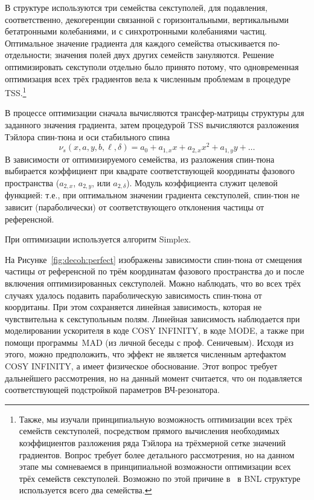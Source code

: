 В структуре используются три семейства секступолей, для подавления, соответственно, декогеренции связанной 
с горизонтальными, вертикальными бетатронными колебаниями, и с синхротронными колебаниями частиц.
Оптимальное значение градиента для каждого семейства отыскивается по-отдельности; значения полей двух
других семейств зануляются. Решение оптимизировать секступоли отдельно было принято потому, что
одновременная оптимизация всех трёх градиентов вела к численным проблемам в процедуре TSS.\footnote{Также,
мы изучали принципиальную возможность оптимизации всех трёх семейств секступолей, посредством прямого
вычисления необходимых коэффициентов разложения ряда Тэйлора на трёхмерной сетке значений градиентов. 
Вопрос требует более детального рассмотрения, но на данном этапе мы сомневаемся в принципиальной возможности
оптимизации всех трёх семейств секступолей. Возможно по этой причине в~\cite[стр.~219]{Eremey:Thesis} в BNL структуре
используется всего два семейства.}

В процессе оптимизации сначала вычисляются трансфер-матрицы структуры для заданного значения градиента, 
затем процедурой TSS вычисляются разложения Тэйлора спин-тюна и оси стабильного спина
\[
\nu_s(x,a,y,b,\ell,\delta) = a_0 + a_{1,x}x + a_{2,x}x^2 + a_{1,y}y + \dots
\]
В зависимости от 
оптимизируемого семейства, из разложения спин-тюна выбирается коэффициент при квадрате соответствующей
координаты фазового пространства ($a_{2,x}$, $a_{2,y}$, или $a_{2,\delta}$). 
Модуль коэффициента служит целевой функцией: т.е., 
при оптимальном значении градиента секступолей, спин-тюн не зависит (параболически) от соответствующего отклонения частицы от референсной.

При оптимизации используется алгоритм Simplex.~\cite[стр.~37]{COSYINF:Manual:Programmer}

На Рисунке~\ref{fig:decoh:perfect} изображены зависимости спин-тюна от смещения частицы от референсной по трём
координатам фазового пространства до и после включения оптимизированных секступолей. Можно наблюдать, что во 
всех трёх случаях удалось подавить параболическую зависимость спин-тюна от коордитаны. При этом сохраняется 
линейная зависимость, которая не чувствительна к секступольным полям. Линейная зависимость наблюдается при
моделировании ускорителя в коде COSY INFINITY, в коде MODE, а также при помощи программы MAD (из личной беседы
с проф. Сеничевым). Исходя из этого, можно предположить, что эффект не является численным артефактом COSY 
INFINITY, а имеет физическое обоснование. Этот вопрос требует дальнейшего рассмотрения, но на данный момент
считается, что он подавляется соответствующей подстройкой параметров ВЧ-резонатора.~\cite[стр.~210,~219]{Eremey:Thesis}

